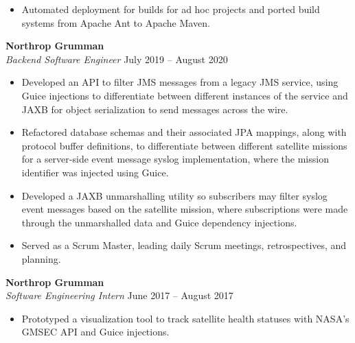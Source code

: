 \documentclass{res}
\begin{document}
\begin{resume}
\begin{itemize}
    \item Automated deployment for builds for ad hoc projects and ported build systems from Apache Ant to Apache Maven.
  \end{itemize}
\vspace*{4mm}
\textbf{Northrop Grumman}\\
\textit{Backend Software Engineer}
\hfill
July 2019 -- August 2020\\[1mm]
	\begin{itemize}
		\vspace{-3mm}
    \item Developed an API to filter JMS messages from a legacy JMS service, using Guice injections to differentiate between different instances of the service and JAXB for object serialization to send messages across the wire.
    \item Refactored database schemas and their associated JPA mappings, along with protocol buffer definitions, to differentiate between different satellite missions for a server-side event message syslog implementation, where the mission identifier was injected using Guice.
    \item Developed a JAXB unmarshalling utility so subscribers may filter syslog event messages based on the satellite mission, where subscriptions were made through the unmarshalled data and Guice dependency injections.
    \item Served as a Scrum Master, leading daily Scrum meetings, retrospectives, and planning.
  \end{itemize}
\textbf{Northrop Grumman}\\
\textit{Software Engineering Intern}
\hfill
June 2017 -- August 2017\\[1mm]
	\begin{itemize}
		\vspace{-3mm}
\item Prototyped a visualization tool to track satellite health statuses with NASA's GMSEC API and Guice injections.
	\end{itemize}

\end{resume}
\end{document}
